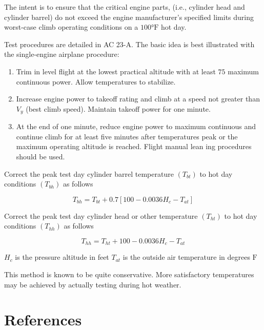 \documentclass[
]{book}
\providecommand{\tightlist}{%
  \setlength{\itemsep}{0pt}\setlength{\parskip}{0pt}}
\begin{document}
The intent is to ensure that the critical engine parts, (i.e., cylinder head and cylinder barrel) do not exceed the engine manufacturer's specified limits during worst-case climb operating conditions on a \(100° \text{F}\) hot day.

Test procedures are detailed in AC 23-A. The basic idea is best illustrated with the single-engine airplane procedure:

\begin{enumerate}
\def\labelenumi{\arabic{enumi}.}
\tightlist
\item
  Trim in level flight at the lowest practical altitude with at least \(75%
  \) maximum continuous power. Allow temperatures to stabilize.
\item
  Increase engine power to takeoff rating and climb at a speed not greater than \(V_y\) (best climb speed). Maintain takeoff power for one minute.
\item
  At the end of one minute, reduce engine power to maximum continuous and continue climb for at least five minutes after temperatures peak or the maximum operating altitude is reached. Flight manual lean ing procedures should be used.
\end{enumerate}

Correct the peak test day cylinder barrel temperature \(\left( T_{bt} \right)\) to hot day conditions \(\left( T_{bh} \right)\) as follows

\[
T_{bh} = T_{bt} +0.7 \left[ 100 - 0.0036 H_c - T_{at} \right]
\]

Correct the peak test day cylinder head or other temperature \(\left( T_{ht} \right)\) to hot day conditions \(\left( T_{hh} \right)\) as follows

\[
T_{hh} = T_{ht} + 100 - 0.0036 H_c - T_{at}
\]

\(H_c\) is the pressure altitude in feet
\(T_{at}\) is the outside air temperature in degrees \(\text{F}\)

This method is known to be quite conservative. More satisfactory temperatures may be achieved by actually testing during hot weather.

\hypertarget{references-8}{%
\section{References}\label{references-8}}
\end{document}

